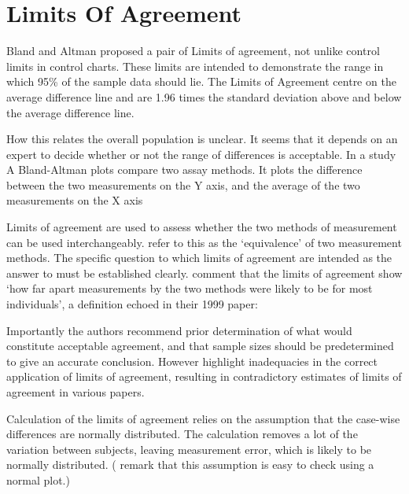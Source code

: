 \documentclass[12pt, a4paper]{report}
\theoremstyle{plain}
\theoremstyle{definition}
\theoremstyle{remark}
\begin{document}

\newpage
	\section{Limits Of Agreement}
	Bland and Altman proposed a pair of Limits of agreement, not unlike control limits in control charts. These
	limits are intended to demonstrate the range in which 95\% of the sample data should lie. The Limits of Agreement centre on the
	average difference line and are 1.96 times the standard deviation above and below the average difference line.


How this relates the overall population is unclear. It seems that
it depends on an expert to decide whether or not the range of
differences is acceptable. In a study A Bland-Altman plots compare
two assay methods. It plots the difference between the two
measurements on the Y axis, and the average of the two
measurements on the X axis

	
Limits of agreement are used to assess whether the two methods of
measurement can be used interchangeably. \citet{BA86} refer to
this as the `equivalence' of two measurement methods. The specific question to which limits of agreement are intended as the answer to must be established clearly. \citet*{BA95} comment that the limits of agreement show `how	far apart measurements by the two methods were likely to be for most individuals', a definition echoed in their 1999 paper:
	


	Importantly the authors recommend prior determination of what would constitute acceptable
	agreement, and that sample sizes should be predetermined to give an accurate conclusion. However \citet{mantha} highlight inadequacies in the correct application of limits of agreement, resulting in contradictory estimates of limits of agreement in various papers.
	
	Calculation of the limits of agreement relies on the assumption that the case-wise differences are normally distributed.
	The calculation removes a lot of the variation between subjects,  leaving measurement error, which is likely to be normally distributed. (\citet{BA99} remark that this assumption is easy to check using a normal plot.)
\end{document}
